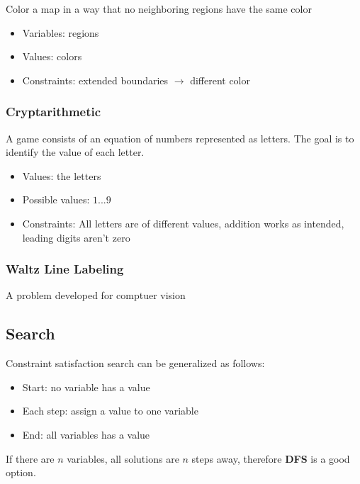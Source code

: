       Color a map in a way that no neighboring regions have the same color

      \begin{itemize}
        \item Variables: regions
        \item Values: colors
        \item Constraints: extended boundaries $ \to $ different color
      \end{itemize}

    \subsubsection{Cryptarithmetic}

      A game consists of an equation of numbers represented as letters.
      The goal is to identify the value of each letter.

      \begin{itemize}
        \item Values: the letters
        \item Possible values: $ 1 ... 9 $
        \item Constraints: All letters are of different values, addition
        works as intended, leading digits aren't zero
      \end{itemize}

    \subsubsection{Waltz Line Labeling}

      A problem developed for comptuer vision

  \subsection{Search}

    Constraint satisfaction search can be generalized as follows:
    \begin{itemize}
      \item Start: no variable has a value
      \item Each step: assign a value to one variable
      \item End: all variables has a value
    \end{itemize}

    If there are $ n $ variables, all solutions are $ n $ steps away,
    therefore \textbf{DFS} is a good option.


